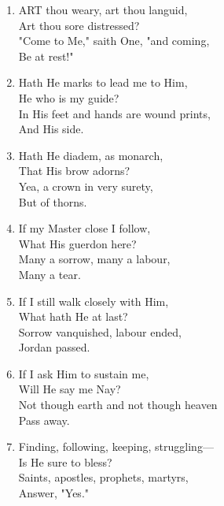 \documentclass[11pt,a4paper]{article}
\begin{document}
\begin{enumerate}
    \item ART thou weary, art thou languid, \\
            Art thou sore distressed? \\
        "Come to Me," saith One, "and coming, \\
            Be at rest!"

    \item Hath He marks to lead me to Him, \\
            He who is my guide? \\
        In His feet and hands are wound prints, \\
            And His side.

    \item Hath He diadem, as monarch, \\
            That His brow adorns? \\
        Yea, a crown in very surety, \\
            But of thorns.

    \item If my Master close I follow, \\
            What His guerdon here? \\
        Many a sorrow, many a labour, \\
            Many a tear.

    \item If I still walk closely with Him, \\
            What hath He at last? \\
        Sorrow vanquished, labour ended, \\
            Jordan passed.

    \item If I ask Him to sustain me, \\
            Will He say me Nay? \\
        Not though earth and not though heaven \\
            Pass away.

    \item Finding, following, keeping, struggling--- \\
            Is He sure to bless? \\
        Saints, apostles, prophets, martyrs, \\
            Answer, "Yes."

\end{enumerate}
\end{document}
